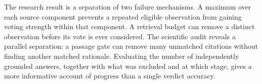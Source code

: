 The research result is a separation of two failure mechanisms. A maximum over each source component prevents a repeated eligible observation from gaining voting strength within that component. A retrieval budget can remove a distinct observation before its vote is ever considered. The scientific audit reveals a parallel separation: a passage gate can remove many unmatched citations without finding another matched rationale. Evaluating the number of independently grounded answers, together with what was excluded and at which stage, gives a more informative account of progress than a single verdict accuracy.
